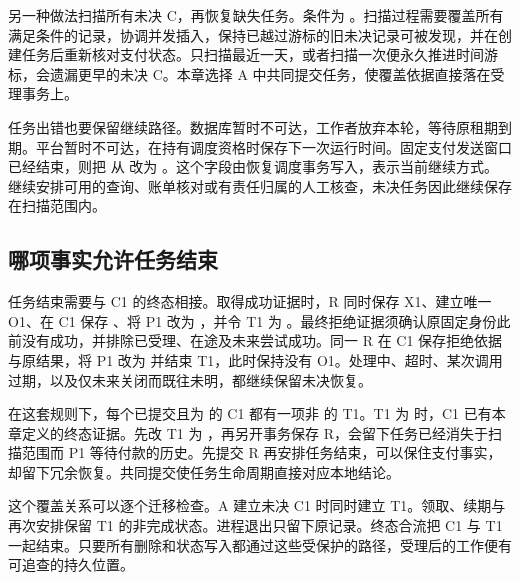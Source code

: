另一种做法扫描所有未决 C，再恢复缺失任务。条件为 。扫描过程需要覆盖所有满足条件的记录，协调并发插入，保持已越过游标的旧未决记录可被发现，并在创建任务后重新核对支付状态。只扫描最近一天，或者扫描一次便永久推进时间游标，会遗漏更早的未决 C。本章选择 A 中共同提交任务，使覆盖依据直接落在受理事务上。

任务出错也要保留继续路径。数据库暂时不可达，工作者放弃本轮，等待原租期到期。平台暂时不可达，在持有调度资格时保存下一次运行时间。固定支付发送窗口已经结束，则把  从  改为 。这个字段由恢复调度事务写入，表示当前继续方式。 继续安排可用的查询、账单核对或有责任归属的人工核查，未决任务因此继续保存在扫描范围内。


\subsection*{哪项事实允许任务结束}

任务结束需要与 C1 的终态相接。取得成功证据时，R 同时保存 X1、建立唯一 O1、在 C1 保存 、将 P1 改为 ，并令 T1 为 。最终拒绝证据须确认原固定身份此前没有成功，并排除已受理、在途及未来尝试成功。同一 R 在 C1 保存拒绝依据与原结果，将 P1 改为  并结束 T1，此时保持没有 O1。处理中、超时、某次调用过期，以及仅未来关闭而既往未明，都继续保留未决恢复。

在这套规则下，每个已提交且为  的 C1 都有一项非  的 T1。T1 为  时，C1 已有本章定义的终态证据。先改 T1 为 ，再另开事务保存 R，会留下任务已经消失于扫描范围而 P1 等待付款的历史。先提交 R 再安排任务结束，可以保住支付事实，却留下冗余恢复。共同提交使任务生命周期直接对应本地结论。

这个覆盖关系可以逐个迁移检查。A 建立未决 C1 时同时建立 T1。领取、续期与再次安排保留 T1 的非完成状态。进程退出只留下原记录。终态合流把 C1 与 T1 一起结束。只要所有删除和状态写入都通过这些受保护的路径，受理后的工作便有可追查的持久位置。
